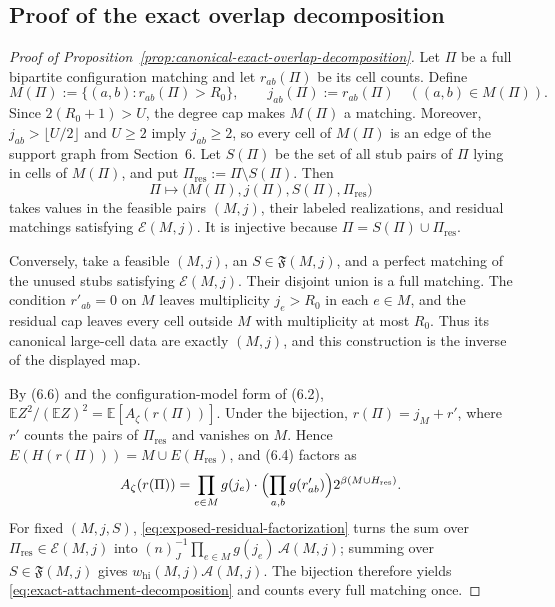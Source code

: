\documentclass[a4paper,10pt,reqno]{amsart}
\numberwithin{equation}{section}
\theoremstyle{plain}
\theoremstyle{remark}
\begin{document}
\subsection{Proof of the exact overlap decomposition}
\label{app:decomposition-proof}

\begin{proof}[Proof of Proposition~\ref{prop:canonical-exact-overlap-decomposition}]
Let $\Pi$ be a full bipartite configuration matching and let $r_{ab}(\Pi)$ be
its cell counts. Define
\[
  M(\Pi):=\{(a,b):r_{ab}(\Pi)>R_0\},
  \qquad
  j_{ab}(\Pi):=r_{ab}(\Pi)\quad((a,b)\in M(\Pi)).
\]
Since $2(R_0+1)>U$, the degree cap makes $M(\Pi)$ a matching. Moreover,
$j_{ab}>\lfloor U/2\rfloor$ and $U\ge2$ imply $j_{ab}\ge2$, so every cell of
$M(\Pi)$ is an edge of the support graph from Section~6. Let $S(\Pi)$
be the set of all stub pairs of $\Pi$ lying in cells of $M(\Pi)$, and put
$\Pi_{\mathrm{res}}:=\Pi\setminus S(\Pi)$. Then
\[
  \Pi\longmapsto
  \bigl(M(\Pi),j(\Pi),S(\Pi),\Pi_{\mathrm{res}}\bigr)
\]
takes values in the feasible pairs $(M,j)$, their labeled realizations, and residual
matchings satisfying $\mathcal E(M,j)$. It is injective because
$\Pi=S(\Pi)\cup\Pi_{\mathrm{res}}$.

Conversely, take a feasible $(M,j)$, an $S\in\mathfrak F(M,j)$, and a perfect
matching of the unused stubs satisfying $\mathcal E(M,j)$. Their disjoint union
is a full matching. The condition $r'_{ab}=0$ on $M$ leaves multiplicity $j_e>R_0$ in
each $e\in M$, and the residual cap leaves every cell outside $M$ with
multiplicity at most $R_0$. Thus its canonical large-cell data are exactly
$(M,j)$, and this construction is the inverse of the displayed map.

By (6.6) and the configuration-model form of (6.2),
$\mathbb E Z^2/(\mathbb E Z)^2=\mathbb E[A_\zeta(r(\Pi))]$. Under the
bijection, $r(\Pi)=j_M+r'$, where $r'$ counts the pairs of
$\Pi_{\mathrm{res}}$ and vanishes on $M$. Hence
$E(H(r(\Pi)))=M\cup E(H_{\mathrm{res}})$, and (6.4) factors as
\[
 A_\zeta(r(\Pi))=\prod_{e\in M}g(j_e)\cdot
 \Bigl(\prod_{a,b}g(r'_{ab})\Bigr)2^{\beta(M\cup H_{\mathrm{res}})}.
\]
For fixed $(M,j,S)$, \eqref{eq:exposed-residual-factorization} turns the sum
over $\Pi_{\mathrm{res}}\in\mathcal E(M,j)$ into
$(n)_J^{-1}\prod_{e\in M}g(j_e)\,\mathcal A(M,j)$; summing over
$S\in\mathfrak F(M,j)$ gives $w_{\mathrm{hi}}(M,j)\mathcal A(M,j)$. The
bijection therefore yields
\eqref{eq:exact-attachment-decomposition} and counts every full matching
once.
\end{proof}
\end{document}
